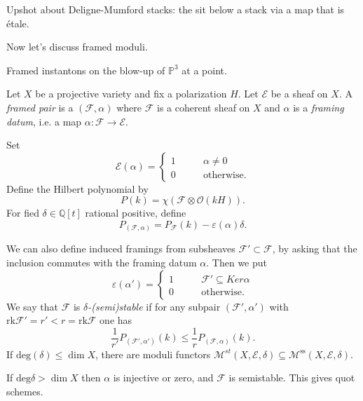 \medskip\noindent
Upshot about Deligne-Mumford stacks:
the sit below a stack via a map that is
étale.


















\medskip\noindent
Now let's discuss framed moduli.

\noindent
Framed instantons on the blow-up of
$\mathbb{P}^3$ at a point.

Let $X$ be a projective variety and fix a
polarization $H$.
Let $\mathcal{E}$ be a sheaf on $X$.
A {\it framed pair} is a
$(\mathcal{F},\alpha)$ where
$\mathcal{F}$ is a coherent sheaf on $X$
and $\alpha$ is a {\it framing datum}, i.e.
a map $\alpha:\mathcal{F} \to \mathcal{E}$.

Set
$$
\mathcal{E}(\alpha)
=\begin{cases}
	1\qquad &\alpha\neq 0 \\
	0\qquad &\text{otherwise} .
\end{cases}
$$
Define the Hilbert polynomial by
$$
P(k)=\chi(\mathcal{F} \otimes
\mathcal{O}(kH)).
$$
For fied $\delta \in \mathbb{Q}[t]$ rational
positive,
define
$$
P_{(\mathcal{F},\alpha)}=P_{\mathcal{F}}(k)-
\varepsilon(\alpha)\delta.
$$

We can also define induced framings from
subsheaves $\mathcal{F}' \subset
\mathcal{F}$, by asking that the inclusion
commutes
with the framing datum $\alpha$.
Then we put
$$
\varepsilon(\alpha')
=\begin{cases}
	1\qquad &\mathcal{F}' \subseteq Ker \alpha
	\\
	0\qquad &\text{otherwise} .
\end{cases}
$$
We say that $\mathcal{F}$ is {\it
$\delta$-(semi)stable}
if for any subpair $(\mathcal{F}',\alpha')$
with
$\text{rk}\mathcal{F}'=r'<r=\text{rk}
\mathcal{F}$
one has
$$
\frac{1}{r'}P_{(\mathcal{F}',\alpha')}(k)
\leq  \frac{1}{r}P_{(\mathcal{F},\alpha)}(k).
$$
If $\text{deg}(\delta)\leq \dim X$,
there are moduli functors
$\mathcal{M}^{st}(X,\mathcal{E},\delta)
\subseteq
\mathcal{M}^{\text{ss}}(X,\mathcal{E},\delta)
$.

\begin{remark}
\label{remark-degree-greater-than-dimension}
If $\text{deg} \delta>\dim X$
then $\alpha$ is injective or zero, and
$\mathcal{F}$ is semistable.
This gives quot schemes.
\end{remark}

